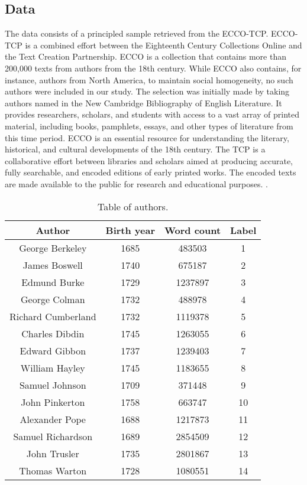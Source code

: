 \documentclass[final]{clv3} %
\begin{document}
\subsection{Data}

The data consists of a principled sample retrieved from the ECCO-TCP. ECCO-TCP is a combined effort between the Eighteenth Century Collections Online and the Text Creation Partnership. ECCO is a collection that contains more than 200,000 texts from authors from the 18th century. While ECCO also contains, for instance, authors from North America, to maintain social homogeneity, no such authors were included in our study. The selection was initially made by taking authors named in the New Cambridge Bibliography of English Literature. It provides researchers, scholars, and students with access to a vast array of printed material, including books, pamphlets, essays, and other types of literature from this time period. ECCO is an essential resource for understanding the literary, historical, and cultural developments of the 18th century. The TCP is a collaborative effort between libraries and scholars aimed at producing accurate, fully searchable, and encoded editions of early printed works. The encoded texts are made available to the public for research and educational purposes. \citep{tolonen2021corpus}.

\begin{table}[htb]
\centering
\begin{tabular}{|c | c | c | c|} 
 \hline
 Author & Birth year & Word count & Label   \\ 
  \hline
 George Berkeley & 1685 & 483503 & 1 \\ 
  \hline
 James Boswell & 1740 & 675187 & 2 \\ 
 \hline
 Edmund Burke & 1729 & 1237897 & 3 \\ 
 \hline
 George Colman  & 1732 & 488978 & 4 \\ 
 \hline
 Richard Cumberland & 1732 & 1119378 & 5 \\ 
 \hline
 Charles Dibdin & 1745 & 1263055 & 6 \\ 
 \hline
 Edward Gibbon & 1737 & 1239403 & 7 \\ 
 \hline
 William Hayley & 1745 & 1183655 & 8 \\ 
 \hline
 Samuel Johnson & 1709 & 371448 & 9 \\ 
 \hline
 John Pinkerton & 1758 & 663747 & 10 \\ 
 \hline
 Alexander Pope & 1688 & 1217873 & 11 \\ 
 \hline
 Samuel Richardson & 1689 & 2854509 & 12 \\ 
 \hline
 John Trusler & 1735 & 2801867 & 13 \\ 
 \hline
 Thomas Warton & 1728 & 1080551 & 14 \\ 
 \hline
\end{tabular}
\caption{Table of authors.}
\label{table:1}
\end{table}
\end{document}
